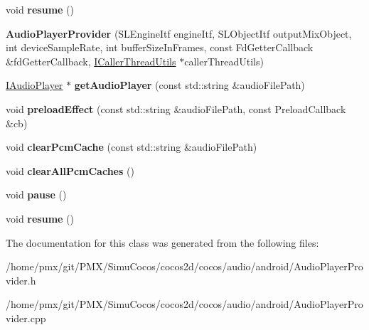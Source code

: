 \begin{DoxyCompactItemize}
void {\bfseries resume} ()
\item 
\mbox{\label{classcocos2d_1_1experimental_1_1AudioPlayerProvider_a4e7bb5a8f1aa8ea2cb5d5e882e28590b}} 
{\bfseries Audio\+Player\+Provider} (S\+L\+Engine\+Itf engine\+Itf, S\+L\+Object\+Itf output\+Mix\+Object, int device\+Sample\+Rate, int buffer\+Size\+In\+Frames, const Fd\+Getter\+Callback \&fd\+Getter\+Callback, \hyperlink{classcocos2d_1_1experimental_1_1ICallerThreadUtils}{I\+Caller\+Thread\+Utils} $\ast$caller\+Thread\+Utils)
\item 
\mbox{\label{classcocos2d_1_1experimental_1_1AudioPlayerProvider_a8e8a77f94d7c8ba7c903d43cd027c247}} 
\hyperlink{classcocos2d_1_1experimental_1_1IAudioPlayer}{I\+Audio\+Player} $\ast$ {\bfseries get\+Audio\+Player} (const std\+::string \&audio\+File\+Path)
\item 
\mbox{\label{classcocos2d_1_1experimental_1_1AudioPlayerProvider_a0c2aaa4e310ba9dba72e83fcf62916a6}} 
void {\bfseries preload\+Effect} (const std\+::string \&audio\+File\+Path, const Preload\+Callback \&cb)
\item 
\mbox{\label{classcocos2d_1_1experimental_1_1AudioPlayerProvider_abfe61ba6c43fb326c4b8243c54ce2a7d}} 
void {\bfseries clear\+Pcm\+Cache} (const std\+::string \&audio\+File\+Path)
\item 
\mbox{\label{classcocos2d_1_1experimental_1_1AudioPlayerProvider_a1656059eaa22a224db8f0c2e5fe00808}} 
void {\bfseries clear\+All\+Pcm\+Caches} ()
\item 
\mbox{\label{classcocos2d_1_1experimental_1_1AudioPlayerProvider_a3e06f4560156f3d76490a6a4de971b49}} 
void {\bfseries pause} ()
\item 
\mbox{\label{classcocos2d_1_1experimental_1_1AudioPlayerProvider_a8b33890fc2268f40662dfa544fcb43ad}} 
void {\bfseries resume} ()
\end{DoxyCompactItemize}


The documentation for this class was generated from the following files\+:\begin{DoxyCompactItemize}
\item 
/home/pmx/git/\+P\+M\+X/\+Simu\+Cocos/cocos2d/cocos/audio/android/Audio\+Player\+Provider.\+h\item 
/home/pmx/git/\+P\+M\+X/\+Simu\+Cocos/cocos2d/cocos/audio/android/Audio\+Player\+Provider.\+cpp\end{DoxyCompactItemize}
